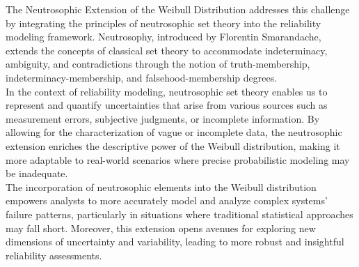\documentclass[12pt,a4paper,oneside]{article}
\begin{document}
The Neutrosophic Extension of the Weibull Distribution addresses this challenge by integrating the principles of neutrosophic set theory into the reliability modeling framework. Neutrosophy, introduced by Florentin Smarandache, extends the concepts of classical set theory to accommodate indeterminacy, ambiguity, and contradictions through the notion of truth-membership, indeterminacy-membership, and falsehood-membership degrees.\\

In the context of reliability modeling, neutrosophic set theory enables us to represent and quantify uncertainties that arise from various sources such as measurement errors, subjective judgments, or incomplete information. By allowing for the characterization of vague or incomplete data, the neutrosophic extension enriches the descriptive power of the Weibull distribution, making it more adaptable to real-world scenarios where precise probabilistic modeling may be inadequate.\\

The incorporation of neutrosophic elements into the Weibull distribution empowers analysts to more accurately model and analyze complex systems' failure patterns, particularly in situations where traditional statistical approaches may fall short. Moreover, this extension opens avenues for exploring new dimensions of uncertainty and variability, leading to more robust and insightful reliability assessments.\\
\end{document}
